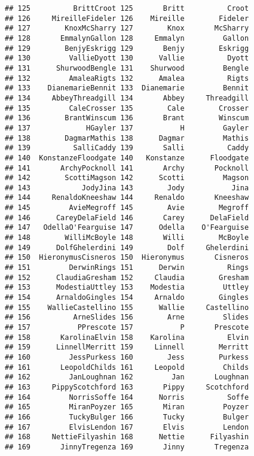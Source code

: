 \documentclass[]{article}
\begin{document}
\begin{verbatim}
## 125          BrittCroot 125       Britt          Croot
## 126     MireilleFideler 126    Mireille        Fideler
## 127        KnoxMcSharry 127        Knox       McSharry
## 128       EmmalynGallon 128     Emmalyn         Gallon
## 129        BenjyEskrigg 129       Benjy        Eskrigg
## 130         VallieDyott 130      Vallie          Dyott
## 131      ShurwoodBengle 131    Shurwood         Bengle
## 132         AmaleaRigts 132      Amalea          Rigts
## 133    DianemarieBennit 133  Dianemarie         Bennit
## 134     AbbeyThreadgill 134       Abbey     Threadgill
## 135         CaleCrosser 135        Cale        Crosser
## 136        BrantWinscum 136       Brant        Winscum
## 137             HGayler 137           H         Gayler
## 138        DagmarMathis 138      Dagmar         Mathis
## 139          SalliCaddy 139       Salli          Caddy
## 140  KonstanzeFloodgate 140   Konstanze      Floodgate
## 141       ArchyPocknoll 141       Archy       Pocknoll
## 142        ScottiMagson 142      Scotti         Magson
## 143            JodyJina 143        Jody           Jina
## 144     RenaldoKneeshaw 144     Renaldo       Kneeshaw
## 145         AvieMegroff 145        Avie        Megroff
## 146      CareyDelaField 146       Carey      DelaField
## 147   OdellaO'Fearguise 147      Odella    O'Fearguise
## 148        WilliMcBoyle 148       Willi        McBoyle
## 149      DolfGhelerdini 149        Dolf     Ghelerdini
## 150  HieronymusCisneros 150  Hieronymus       Cisneros
## 151         DerwinRings 151      Derwin          Rings
## 152      ClaudiaGresham 152     Claudia        Gresham
## 153      ModestiaUttley 153    Modestia         Uttley
## 154      ArnaldoGingles 154     Arnaldo        Gingles
## 155    WallieCastellino 155      Wallie     Castellino
## 156          ArneSlides 156        Arne         Slides
## 157           PPrescote 157           P       Prescote
## 158       KarolinaElvin 158    Karolina          Elvin
## 159      LinnellMerritt 159     Linnell        Merritt
## 160         JessPurkess 160        Jess        Purkess
## 161       LeopoldChilds 161     Leopold         Childs
## 162         JanLoughnan 162         Jan       Loughnan
## 163     PippyScotchford 163       Pippy     Scotchford
## 164         NorrisSoffe 164      Norris          Soffe
## 165         MiranPoyzer 165       Miran         Poyzer
## 166         TuckyBulger 166       Tucky         Bulger
## 167         ElvisLendon 167       Elvis         Lendon
## 168     NettieFilyashin 168      Nettie      Filyashin
## 169       JinnyTregenza 169       Jinny       Tregenza

\end{verbatim}
\end{document}
